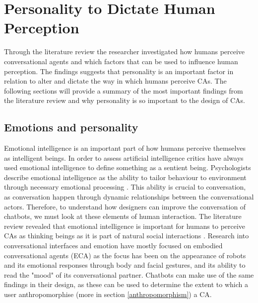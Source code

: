 \section{Personality to Dictate Human Perception}

Through the literature review the researcher investigated how humans perceive conversational agents and which factors that can be used to influence human perception. The findings suggests that personality is an important factor in relation to alter and dictate the way in which humans perceive CAs. The following sections will provide a summary of the most important findings from the literature review and why personality is so important to the design of CAs.

\subsection{Emotions and personality}
    \label{emotionspersonality}
Emotional intelligence is an important part of how humans perceive themselves as intelligent beings. In order to assess artificial intelligence critics have always used emotional intelligence to define something as a sentient being. Psychologists describe emotional intelligence as the ability to tailor behaviour to environment through necessary emotional processing \citep{callejas2011}. This ability is crucial to conversation, as conversation happen through dynamic relationships between the conversational actors. Therefore, to understand how designers can improve the conversation of chatbots, we must look at these elements of human interaction. The literature review revealed that emotional intelligence is important for humans to perceive CAs as thinking beings as it is part of natural social interactions \citep{Griol2015a,Griol2017,Balzarotti2014,Lemon2012,Mencia2012,McTear2016a}. Research into conversational interfaces and emotion have mostly focused on embodied conversational agents (ECA) \citep{Lester1997,Stern2003, Beun2003,Reeves1996} as the focus has been on the appearance of robots and its emotional responses through body and facial gestures, and its ability to read the "mood" of its conversational partner. Chatbots can make use of the same findings in their design, as these can be used to determine the extent to which a user anthropomorphise (more in section \ref{anthropomorphism}) a CA.

